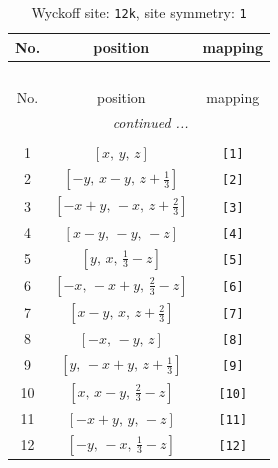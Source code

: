 \documentclass[fleqn,8pt]{jsarticle}
\begin{document}
\renewcommand{\arraystretch}{1.2}
\begin{longtable}{ccc}
\caption{Wyckoff site: {\tt 12k}, site symmetry: {\tt 1}}
 \\
 \hline \hline
No. & position & mapping \\ \hline \endfirsthead

\multicolumn{2}{l}{\tablename\ \thetable{}} \\
 \hline \hline
No. & position & mapping \\ \hline \endhead

 \hline \hline
\multicolumn{2}{r}{\footnotesize\it continued ...} \\ \endfoot

 \hline \hline
\multicolumn{2}{r}{} \\ \endlastfoot

1 & $\left[ x,\, y,\, z \right]$ & {\tt [1]} \\ \hline
2 & $\left[ - y,\, x - y,\, z + \frac{1}{3} \right]$ & {\tt [2]} \\ \hline
3 & $\left[ - x + y,\, - x,\, z + \frac{2}{3} \right]$ & {\tt [3]} \\ \hline
4 & $\left[ x - y,\, - y,\, - z \right]$ & {\tt [4]} \\ \hline
5 & $\left[ y,\, x,\, \frac{1}{3} - z \right]$ & {\tt [5]} \\ \hline
6 & $\left[ - x,\, - x + y,\, \frac{2}{3} - z \right]$ & {\tt [6]} \\ \hline
7 & $\left[ x - y,\, x,\, z + \frac{2}{3} \right]$ & {\tt [7]} \\ \hline
8 & $\left[ - x,\, - y,\, z \right]$ & {\tt [8]} \\ \hline
9 & $\left[ y,\, - x + y,\, z + \frac{1}{3} \right]$ & {\tt [9]} \\ \hline
10 & $\left[ x,\, x - y,\, \frac{2}{3} - z \right]$ & {\tt [10]} \\ \hline
11 & $\left[ - x + y,\, y,\, - z \right]$ & {\tt [11]} \\ \hline
12 & $\left[ - y,\, - x,\, \frac{1}{3} - z \right]$ & {\tt [12]} \\
\end{longtable}
\end{document}
